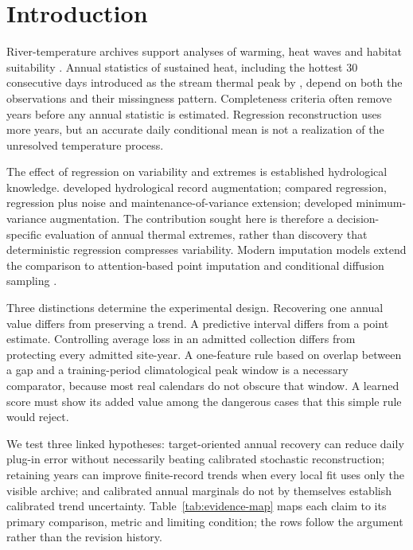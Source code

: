 \documentclass[draft,linenumbers]{agujournal2025}
\begin{document}
\section{Introduction}
River-temperature archives support analyses of warming, heat waves and habitat suitability \cite{caissie2006,michel2020,vanhamel2024}. Annual statistics of sustained heat, including the hottest 30 consecutive days introduced as the stream thermal peak by , depend on both the observations and their missingness pattern. Completeness criteria often remove years before any annual statistic is estimated. Regression reconstruction uses more years, but an accurate daily conditional mean is not a realization of the unresolved temperature process.

The effect of regression on variability and extremes is established hydrological knowledge.  developed hydrological record augmentation;  compared regression, regression plus noise and maintenance-of-variance extension;  developed minimum-variance augmentation. The contribution sought here is therefore a decision-specific evaluation of annual thermal extremes, rather than discovery that deterministic regression compresses variability. Modern imputation models extend the comparison to attention-based point imputation and conditional diffusion sampling \cite{saits2023,csdi2021}.

Three distinctions determine the experimental design. Recovering one annual value differs from preserving a trend. A predictive interval differs from a point estimate. Controlling average loss in an admitted collection differs from protecting every admitted site-year. A one-feature rule based on overlap between a gap and a training-period climatological peak window is a necessary comparator, because most real calendars do not obscure that window. A learned score must show its added value among the dangerous cases that this simple rule would reject.

We test three linked hypotheses: target-oriented annual recovery can reduce daily plug-in error without necessarily beating calibrated stochastic reconstruction; retaining years can improve finite-record trends when every local fit uses only the visible archive; and calibrated annual marginals do not by themselves establish calibrated trend uncertainty.
Table~\ref{tab:evidence-map} maps each claim to its primary comparison, metric and limiting condition; the rows follow the argument rather than the revision history.

\end{document}
